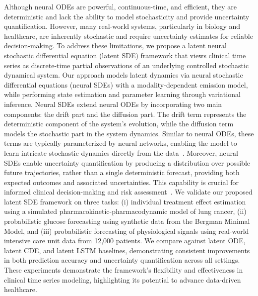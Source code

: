 \documentclass[preprint,12pt]{elsarticle}
\begin{document}
Although neural ODEs are powerful, continuous-time, and efficient, they are deterministic and lack the ability to model stochasticity and provide uncertainty quantification. However, many real-world systems, particularly in biology and healthcare, are inherently stochastic and require  uncertainty estimates for reliable decision-making. To address these limitations, we propose a latent neural stochastic differential equation (latent SDE) framework that views clinical time series as discrete-time partial observations of an underlying controlled stochastic dynamical system. Our approach models latent dynamics via neural stochastic differential equations (neural SDEs) with a modality-dependent emission model, while performing state estimation and parameter learning through variational inference. Neural SDEs extend neural ODEs by incorporating two main components: the drift part and the diffusion part. The drift term represents the deterministic component of the system's evolution, while the diffusion term models the stochastic part in the system dynamics. Similar to neural ODEs, these terms are typically parameterized by neural networks, enabling the model to learn intricate stochastic dynamics directly from the data~\citep{kidger2022neural,tzen2019neural,li2020scalable}. Moreover, neural SDEs enable uncertainty quantification by producing a distribution over possible future trajectories, rather than a single deterministic forecast, providing both expected outcomes and associated uncertainties. This capability is crucial for informed clinical decision-making and risk assessment~\citep{kong2020sde}. We validate our proposed latent SDE framework on three tasks: (i) individual treatment effect estimation using a simulated pharmacokinetic-pharmacodynamic model of lung cancer, (ii) probabilistic glucose forecasting using synthetic data from the Bergman Minimal Model, and (iii) probabilistic forecasting of physiological signals using real-world intensive care unit data from 12,000 patients. We compare against latent ODE, latent CDE, and latent LSTM baselines, demonstrating consistent improvements in both prediction accuracy and uncertainty quantification across all settings. These experiments demonstrate the framework's flexibility and effectiveness in clinical time series modeling, highlighting its potential to advance data-driven healthcare.
\end{document}

